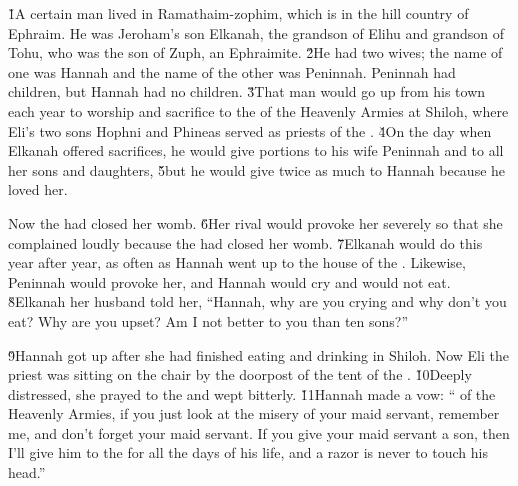 


\v{1}A certain man lived in Ramathaim-zophim, which is in the hill country of Ephraim. He was Jeroham's son Elkanah, the grandson of Elihu and grandson of Tohu, who was the son of Zuph, an Ephraimite. \v{2}He had two wives; the name of one was Hannah and the name of the other was Peninnah. Peninnah had children, but Hannah had no children. \v{3}That man would go up from his town each year to worship and sacrifice to the  of the Heavenly Armies at Shiloh, where Eli's two sons Hophni and Phineas served as priests of the . \v{4}On the day when Elkanah offered sacrifices, he would give portions to his wife Peninnah and to all her sons and daughters, \v{5}but he would give twice as much to Hannah because he loved her.

Now the  had closed her womb. \v{6}Her rival would provoke her severely so that she complained loudly because the  had closed her womb. \v{7}Elkanah would do this year after year, as often as Hannah went up to the house of the . Likewise, Peninnah would provoke her, and Hannah would cry and would not eat. \v{8}Elkanah her husband told her, ``Hannah, why are you crying and why don't you eat? Why are you upset? Am I not better to you than ten sons?''

\v{9}Hannah got up after she had finished eating and drinking in Shiloh. Now Eli the priest was sitting on the chair by the doorpost of the tent of the . \v{10}Deeply distressed, she prayed to the  and wept bitterly. \v{11}Hannah made a vow: `` of the Heavenly Armies, if you just look at the misery of your maid servant, remember me, and don't forget your maid servant. If you give your maid servant a son, then I'll give him to the  for all the days of his life, and a razor is never to touch his head.''

